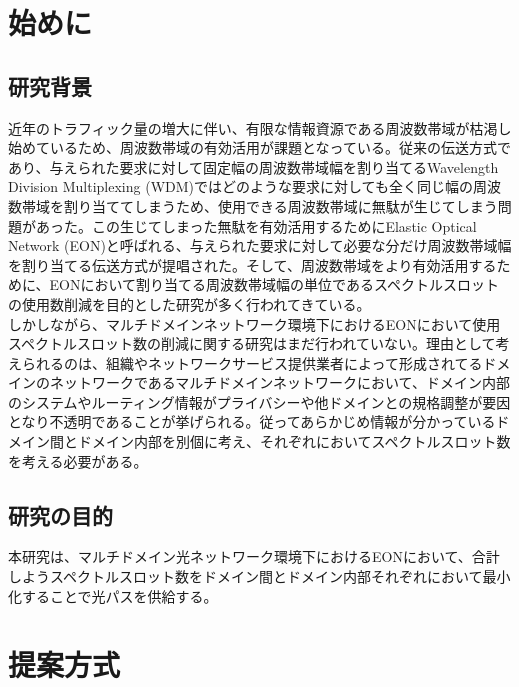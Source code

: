 \documentclass[a4j,twocolumn,fleqn]{jarticle}
\begin{document}
 
\Title
\section{始めに}
\subsection{研究背景}
近年のトラフィック量の増大に伴い、有限な情報資源である周波数帯域が枯渇し始めているため、周波数帯域の有効活用が課題となっている。従来の伝送方式であり、与えられた要求に対して固定幅の周波数帯域幅を割り当てるWavelength Division Multiplexing (WDM)ではどのような要求に対しても全く同じ幅の周波数帯域を割り当ててしまうため、使用できる周波数帯域に無駄が生じてしまう問題があった。この生じてしまった無駄を有効活用するためにElastic Optical Network (EON)と呼ばれる、与えられた要求に対して必要な分だけ周波数帯域幅を割り当てる伝送方式が提唱された。そして、周波数帯域をより有効活用するために、EONにおいて割り当てる周波数帯域幅の単位であるスペクトルスロットの使用数削減を目的とした研究が多く行われてきている。\\
しかしながら、マルチドメインネットワーク環境下におけるEONにおいて使用スペクトルスロット数の削減に関する研究はまだ行われていない。理由として考えられるのは、組織やネットワークサービス提供業者によって形成されてるドメインのネットワークであるマルチドメインネットワークにおいて、ドメイン内部のシステムやルーティング情報がプライバシーや他ドメインとの規格調整が要因となり不透明であることが挙げられる。従ってあらかじめ情報が分かっているドメイン間とドメイン内部を別個に考え、それぞれにおいてスペクトルスロット数を考える必要がある。
\subsection{研究の目的}
本研究は、マルチドメイン光ネットワーク環境下におけるEONにおいて、合計しようスペクトルスロット数をドメイン間とドメイン内部それぞれにおいて最小化することで光パスを供給する。
\section{提案方式}
%
\end{document}
